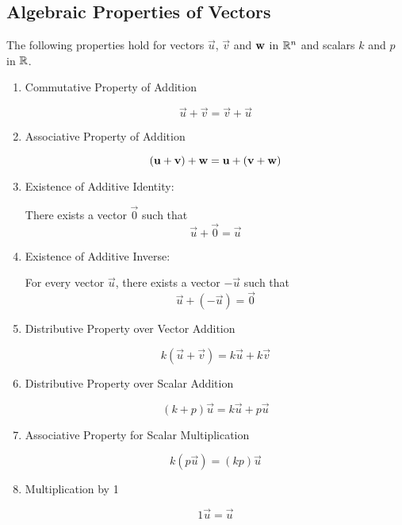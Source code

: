 \documentclass{ximera}
\begin{document}
\subsection{Algebraic Properties of Vectors}
    The following properties hold for vectors $\vec{u}$, $\vec{v}$ and ${\bf w}$ in $\RR^n$ and scalars $k$ and $p$ in $\RR$.
  \begin{enumerate}
  \item 
  Commutative Property of Addition
\begin{expandable}  
  $$\vec{u}+\vec{v}=\vec{v}+\vec{u}$$
\end{expandable}  
  \item 
  Associative Property of Addition
  \begin{expandable}
  $$(\vec{u}+\vec{v})+{\bf w}=\vec{u}+(\vec{v}+{\bf w})$$
   \end{expandable}
  \item 
  Existence of Additive Identity: 
  \begin{expandable}There exists a vector $\vec{0}$ such that
  $$\vec{u}+\vec{0}=\vec{u}$$
  \end{expandable}
  \item 
  Existence of Additive Inverse: 
  \begin{expandable}For every vector $\vec{u}$, there exists a vector $-\vec{u}$ such that
  $$\vec{u}+(-\vec{u})=\vec{0}$$
  \end{expandable}
  \item
  Distributive Property over Vector Addition
  \begin{expandable}
  $$k(\vec{u}+\vec{v})=k\vec{u}+k\vec{v}$$
  \end{expandable}
  \item
  Distributive Property over Scalar Addition
  \begin{expandable}
  $$(k+p)\vec{u}=k\vec{u}+p\vec{u}$$
  \end{expandable}
  \item 
  Associative Property for Scalar Multiplication
  \begin{expandable}
  $$k(p\vec{u})=(kp)\vec{u}$$
  \end{expandable}
  \item 
  Multiplication by 1
  \begin{expandable}
  $$1\vec{u}=\vec{u}$$
  \end{expandable}
  \end{enumerate}
\end{document}
